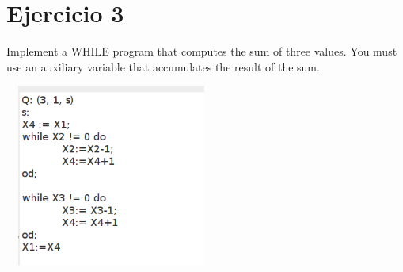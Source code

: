 \documentclass[fleqn, 10pt]{article}
\theoremstyle{plain}
\theoremstyle{definition}
\begin{document}
\section{Ejercicio 3}
Implement a WHILE program that computes the sum of three values. You
must use an auxiliary variable that accumulates the result of the sum.

\begin{center}
\includegraphics[width=7cm, height=6cm]{3.png}
\end{center}
\end{document}
